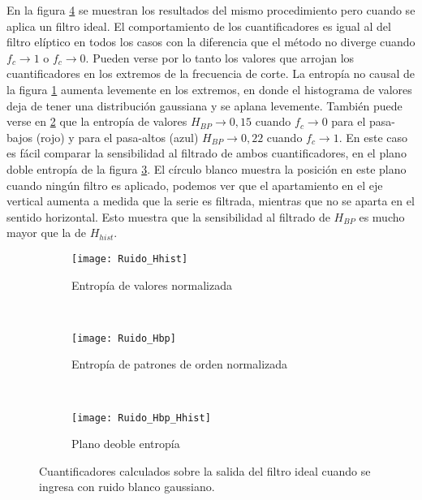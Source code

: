 En la figura \ref{fig:ideal} se muestran los resultados del mismo procedimiento pero cuando se aplica un filtro ideal.
El comportamiento de los cuantificadores es igual al del filtro elíptico en todos los casos con la diferencia que el método no diverge cuando $f_c\to1$ o $f_c\to0$.
Pueden verse por lo tanto los valores que arrojan los cuantificadores en los extremos de la frecuencia de corte.
La entropía no causal de la figura \ref{subfig:ideal_Hhist} aumenta levemente en los extremos, en donde el histograma de valores deja de tener una distribución gaussiana y se aplana levemente.
También puede verse en \ref{subfig:ideal_Hbp} que la entropía de valores $H_{BP}\to0,15$ cuando $f_c\to0$ para el pasa-bajos (rojo) y para el pasa-altos (azul) $H_{BP}\to0,22$ cuando $f_c\to1$.
En este caso es fácil comparar la sensibilidad al filtrado de ambos cuantificadores, en el plano doble entropía de la figura \ref{subfig:ideal_HbpHhist}.
El círculo blanco muestra la posición en este plano cuando ningún filtro es aplicado, podemos ver que el apartamiento en el eje vertical aumenta a medida que la serie es filtrada, mientras que no se aparta en el sentido horizontal.
Esto muestra que la sensibilidad al filtrado de $H_{BP}$ es mucho mayor que la de $H_{hist}$.

\begin{figure}[h]
    \centering
    \begin{subfigure}[t]{0.32\textwidth}
        \texttt{[image: Ruido\_Hhist]}
        \caption{Entropía de valores normalizada}
        \label{subfig:ideal_Hhist}
    \end{subfigure}
    ~ %
    \begin{subfigure}[t]{0.32\textwidth}
        \texttt{[image: Ruido\_Hbp]}
        \caption{Entropía de patrones de orden normalizada}
        \label{subfig:ideal_Hbp}
    \end{subfigure}
    ~ %
    \begin{subfigure}[t]{0.32\textwidth}
        \texttt{[image: Ruido\_Hbp\_Hhist]}
        \caption{Plano deoble entropía}
        \label{subfig:ideal_HbpHhist}
    \end{subfigure}
    \caption{Cuantificadores calculados sobre la salida del filtro ideal cuando se ingresa con ruido blanco gaussiano.}\label{fig:ideal}
\end{figure}

